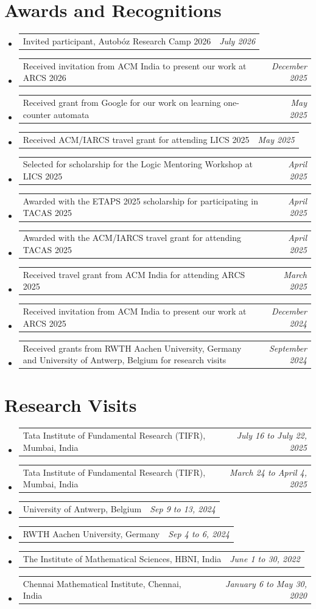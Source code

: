 \documentclass[a4paper,11pt]{article}
\makeatletter
\newcommand{\resumePoint}[2]{
\vspace{0.5mm}\item
    \begin{tabular*}{0.98\textwidth}[t]{l@{\extracolsep{\fill}}r}
        {\hspace{1mm}#1} & \textit{\footnotesize{#2}} \\
    \end{tabular*}
    \vspace{-2.4mm}
}
\newcommand{\talkPoint}[2]{
\vspace{0.5mm}\item
    \begin{tabular*}{0.98\textwidth}[t]{@{}p{0.8\textwidth}@{\extracolsep{\fill}}r@{}}
        {\hspace{1mm}#1} & \textit{\footnotesize{#2}} \\
    \end{tabular*}
    \vspace{-2.4mm}
}
\newcommand{\resumeSubHeadingListStart}{\begin{itemize}[leftmargin=*,labelsep=0mm]}
\newcommand{\resumeSubHeadingListEnd}{\end{itemize}\vspace{2mm}}
\makeatother
\begin{document}
  \section{{\footnotesize \faUniversity}\textbf{ Awards and Recognitions}}
  \resumeSubHeadingListStart
  \resumePoint
  {Invited participant, Autobóz Research Camp 2026} {July 2026}
  \resumePoint
      {Received invitation from ACM India to present our work at ARCS 2026}{December 2025}
      \resumePoint
      {Received grant from Google for our work on learning one-counter automata}{May 2025}
  \resumePoint
      {Received ACM/IARCS travel grant for attending LICS 2025}{May 2025}
  	\resumePoint
      {Selected for scholarship for the Logic Mentoring Workshop at LICS 2025}{April 2025}
 \resumePoint
  	{Awarded with the ETAPS 2025 scholarship for participating in TACAS 2025}{April 2025}
	\resumePoint
      {Awarded with the ACM/IARCS travel grant for attending TACAS 2025}{April 2025}
      \resumePoint
      {Received travel grant from ACM India for attending ARCS 2025}{March 2025}
      	\resumePoint
      {Received invitation from ACM India to present our work at ARCS 2025}{December 2024}
        \talkPoint
      {Received grants from RWTH Aachen University, Germany and University of Antwerp, Belgium for research visits}{September 2024}
      
      \vspace{-2.0mm}
 \resumeSubHeadingListEnd
 \vspace{.3cm}
 
 \vspace{.3cm}
  \section{{\footnotesize \faUniversity}\textbf{ Research Visits}}
  \resumeSubHeadingListStart
        \resumePoint
      {Tata Institute of Fundamental Research (TIFR), Mumbai, India}{July 16 to July 22, 2025}
      \resumePoint
      {Tata Institute of Fundamental Research (TIFR), Mumbai, India}{March 24 to April 4, 2025}
  \resumePoint
      {University of Antwerp, Belgium}{Sep 9 to 13, 2024}
  	\resumePoint
      {RWTH Aachen University, Germany}{Sep 4 to 6, 2024}
      \resumePoint
      {The Institute of Mathematical Sciences, HBNI, India}{June 1 to 30, 2022}
      \resumePoint
      {Chennai Mathematical Institute, Chennai, India}{January 6 to May 30, 2020}
      \vspace{-2.0mm}
 \resumeSubHeadingListEnd
 \vspace{.3cm}
\end{document}
